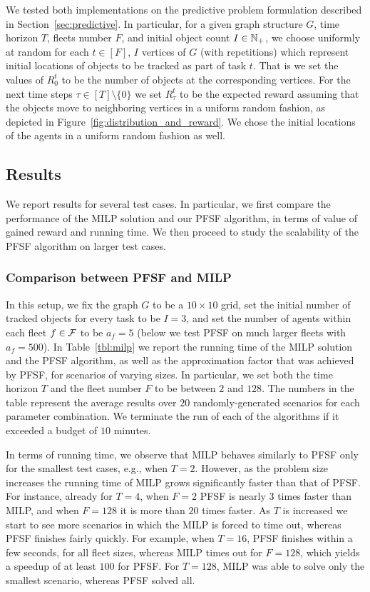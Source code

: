 \documentclass[conference]{IEEEtran}
\begin{document}
We tested both implementations on the predictive problem formulation described in Section~\ref{sec:predictive}. In particular, for a given graph structure $G$, time horizon $T$, fleets number $F$, and initial object count $I\in \mathbb{N}_+$, we choose uniformly at random for each $t\in [F]$, $I$ vertices of $G$ (with repetitions) 
which represent initial locations of objects to be tracked as part of task $t$. That is we set the values of $R^t_0$ to be the number of objects at the corresponding vertices. For the next time steps $\tau\in [T]\setminus \{0\}$ we set $R^t_\tau$ to be the expected reward assuming that the objects move to neighboring vertices in a uniform random fashion, as depicted in Figure~\ref{fig:distribution_and_reward}. We chose the initial locations of the agents in a uniform random fashion as well. 

\subsection{Results}
We report results for several test cases. In particular, we first compare the performance of the MILP solution and our PFSF algorithm, in terms of value of gained reward and running time. We then proceed to study the scalability of the PFSF algorithm on larger test cases. 

\subsubsection{Comparison between PFSF and  MILP}
In this setup, we fix the graph $G$ to be a $10\times 10$ grid, set the initial number of tracked objects for every task to be $I=3$, and set the number of agents within each fleet $f\in \mathcal{F}$ to be $a_f=5$ (below we test PFSF on much larger fleets with $a_f=500$). In Table~\ref{tbl:milp} we report the running time of the MILP solution and the PFSF algorithm, as well as the approximation factor that was achieved by PFSF, for scenarios of varying sizes. In particular, we set both the time horizon $T$ and the fleet number $F$ to be between $2$ and $128$. The numbers in the table represent the average results over $20$ randomly-generated scenarios for each parameter combination. We terminate the run of each of the algorithms if it exceeded a budget of $10$ minutes. 

In terms of running time, we observe that MILP behaves similarly to PFSF only for the smallest test cases, e.g., when $T=2$. However, as the problem size increases the running time of MILP grows significantly faster than that of PFSF. For instance, already for $T=4$, when $F=2$ PFSF is nearly $3$ times faster than MILP, and when $F=128$ it is more than $20$ times faster. As $T$ is increased we start to see more scenarios in which the MILP is forced to time out, whereas PFSF finishes fairly quickly. For example, when $T=16$, PFSF finishes within a few seconds, for all fleet sizes, whereas MILP times out for $F=128$, which yields a speedup of at least $100$ for PFSF. For $T=128$, MILP was able to solve only the smallest scenario, whereas PFSF solved all.
\end{document}
